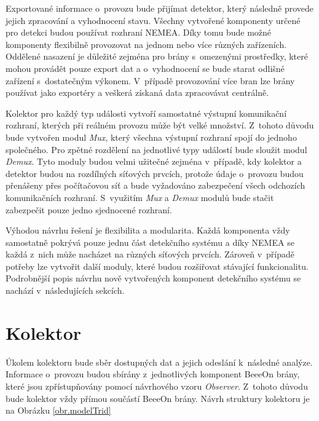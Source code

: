  Exportované informace o~provozu bude přijímat detektor, který následně provede jejich zpracování a 
 vyhodnocení stavu. Všechny vytvořené komponenty určené pro detekci budou používat rozhraní 
 NEMEA. Díky tomu bude možné komponenty flexibilně provozovat na jednom nebo více různých zařízeních.
 Oddělené nasazení je důležité zejména pro brány s~omezenými prostředky, které mohou provádět 
 pouze export dat a o~vyhodnocení se bude starat odlišné zařízení s~dostatečným výkonem. V~případě 
 provozování více bran lze brány používat jako exportéry a veškerá získaná data zpracovávat 
 centrálně. 
 
 Kolektor pro každý typ události vytvoří samostatné výstupní komunikační rozhraní, kterých 
 při reálném provozu může být velké množství. Z~tohoto důvodu  
 bude vytvořen modul \textit{Mux}, který všechna výstupní rozhraní spojí do jednoho společného. 
 Pro zpětné rozdělení na jednotlivé typy událostí bude sloužit modul \textit{Demux}. Tyto moduly budou velmi užitečné
 zejména v~případě, kdy kolektor a detektor budou na rozdílných síťových prvcích, protože údaje 
 o~provozu budou přenášeny přes počítačovou síť a bude vyžadováno zabezpečení všech odchozích komunikačních
 rozhraní. S~využitím \textit{Mux} a \textit{Demux} modulů bude stačit zabezpečit pouze jedno sjednocené rozhraní. 
 
 Výhodou návrhu řešení je flexibilita a modularita. Každá komponenta vždy samostatně pokrývá pouze jednu
 část detekčního systému a díky NEMEA se každá z~nich může nacházet na různých síťových prvcích. Zároveň
 v~případě potřeby lze vytvořit další moduly, které budou rozšiřovat stávající funkcionalitu.
 Podrobnější popis návrhu nově vytvořených komponent detekčního systému se nachází v~následujících sekcích.
 
 \section{Kolektor}
 Úkolem kolektoru bude sběr dostupných dat a jejich odeslání k~následné analýze. Informace
o~provozu budou sbírány z~jednotlivých komponent BeeeOn brány, které jsou zpřístupňovány pomocí 
 návrhového vzoru \textit{Observer}. Z~tohoto důvodu bude kolektor vždy přímou součástí BeeeOn brány. 
 Návrh struktury kolektoru je na Obrázku \ref{obr.modelTrid}
 
